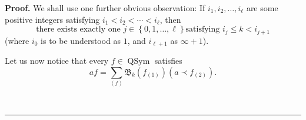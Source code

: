 \documentclass
[numbers=enddot,12pt,final,onecolumn,notitlepage,abstracton]{scrartcl}%
\theoremstyle{definition}
\newenvironment{proof}[1][Proof]{\noindent\textbf{#1.} }{\ \rule{0.5em}{0.5em}}
\newenvironment{verlong}{}{}
\let\sumnonlimits\sum
\renewcommand{\sum}{\sumnonlimits\limits}
\begin{document}
\begin{proof}
\begin{verlong}
We shall use one further obvious observation: If $i_{1},i_{2},\ldots,i_{\ell}$
are some positive integers satisfying $i_{1}<i_{2}<\cdots<i_{\ell}$, then%
\begin{equation}
\text{there exists exactly one }j\in\left\{  0,1,\ldots,\ell\right\}  \text{
satisfying }i_{j}\leq k<i_{j+1} \label{pf.thm.beldend.exactlyonej}%
\end{equation}
(where $i_{0}$ is to be understood as $1$, and $i_{\ell+1}$ as $\infty+1$).

Let us now notice that every $f\in\operatorname*{QSym}$ satisfies%
\begin{equation}
af=\sum_{\left(  f\right)  }\mathfrak{B}_{k}\left(  f_{\left(  1\right)
}\right)  \left(  a\left.  \prec\right.  f_{\left(  2\right)  }\right)  .
\label{pf.thm.beldend.mainlem}%
\end{equation}



\end{verlong}
\end{proof}
\end{document}
